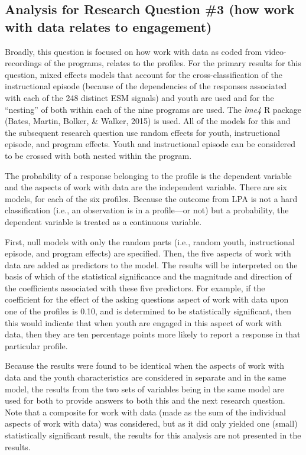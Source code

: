 \documentclass[]{msu-thesis}
\theoremstyle{definition}
\theoremstyle{definition}
\theoremstyle{definition}
\theoremstyle{remark}
\begin{document}
\subsection{Analysis for Research Question \#3 (how work with data
relates to
engagement)}\label{analysis-for-research-question-3-how-work-with-data-relates-to-engagement}

Broadly, this question is focused on how work with data as coded from
video-recordings of the programs, relates to the profiles. For the
primary results for this question, mixed effects models that account for
the cross-classification of the instructional episode (because of the
dependencies of the responses associated with each of the 248 distinct
ESM signals) and youth are used and for the ``nesting'' of both within
each of the nine programs are used. The \emph{lme4} R package (Bates,
Martin, Bolker, \& Walker, 2015) is used. All of the models for this and
the subsequent research question use random effects for youth,
instructional episode, and program effects. Youth and instructional
episode can be considered to be crossed with both nested within the
program.

The probability of a response belonging to the profile is the dependent
variable and the aspects of work with data are the independent variable.
There are six models, for each of the six profiles. Because the outcome
from LPA is not a hard classification (i.e., an observation is in a
profile---or not) but a probability, the dependent variable is treated
as a continuous variable.

First, null models with only the random parts (i.e., random youth,
instructional episode, and program effects) are specified. Then, the
five aspects of work with data are added as predictors to the model. The
results will be interpreted on the basis of which of the statistical
significance and the magnitude and direction of the coefficients
associated with these five predictors. For example, if the coefficient
for the effect of the asking questions aspect of work with data upon one
of the profiles is 0.10, and is determined to be statistically
significant, then this would indicate that when youth are engaged in
this aspect of work with data, then they are ten percentage points more
likely to report a response in that particular profile.

Because the results were found to be identical when the aspects of work
with data and the youth characteristics are considered in separate and
in the same model, the results from the two sets of variables being in
the same model are used for both to provide answers to both this and the
next research question. Note that a composite for work with data (made
as the sum of the individual aspects of work with data) was considered,
but as it did only yielded one (small) statistically significant result,
the results for this analysis are not presented in the results.
\end{document}
